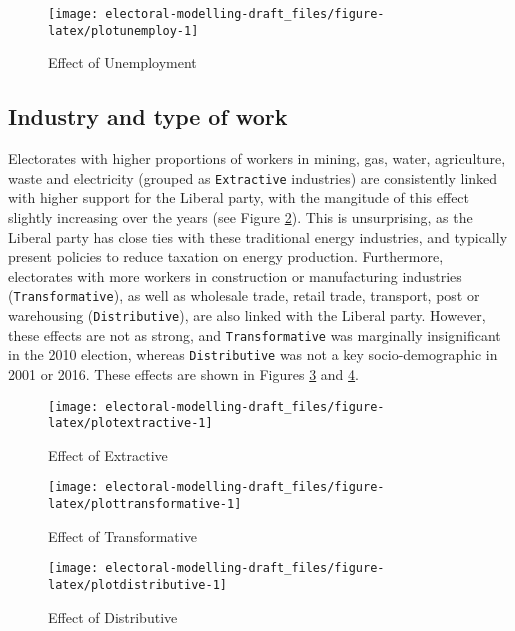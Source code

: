 \documentclass[openany]{book}
\begin{document}
\begin{figure}[h]

{\centering \texttt{[image: electoral-modelling-draft\_files/figure-latex/plotunemploy-1]} 

}

\caption{Effect of Unemployment}\label{fig:plotunemploy}
\end{figure}

\hypertarget{industry-and-type-of-work}{%
\subsection{Industry and type of work}\label{industry-and-type-of-work}}

Electorates with higher proportions of workers in mining, gas, water, agriculture, waste and electricity (grouped as \texttt{Extractive} industries) are consistently linked with higher support for the Liberal party, with the mangitude of this effect slightly increasing over the years (see Figure \ref{fig:plotextractive}). This is unsurprising, as the Liberal party has close ties with these traditional energy industries, and typically present policies to reduce taxation on energy production. Furthermore, electorates with more workers in construction or manufacturing industries (\texttt{Transformative}), as well as wholesale trade, retail trade, transport, post or warehousing (\texttt{Distributive}), are also linked with the Liberal party. However, these effects are not as strong, and \texttt{Transformative} was marginally insignificant in the 2010 election, whereas \texttt{Distributive} was not a key socio-demographic in 2001 or 2016. These effects are shown in Figures \ref{fig:plottransformative} and \ref{fig:plotdistributive}.

\begin{figure}[h]

{\centering \texttt{[image: electoral-modelling-draft\_files/figure-latex/plotextractive-1]} 

}

\caption{Effect of Extractive}\label{fig:plotextractive}
\end{figure}

\begin{figure}[h]

{\centering \texttt{[image: electoral-modelling-draft\_files/figure-latex/plottransformative-1]} 

}

\caption{Effect of Transformative}\label{fig:plottransformative}
\end{figure}
\begin{figure}[h]

{\centering \texttt{[image: electoral-modelling-draft\_files/figure-latex/plotdistributive-1]} 

}

\caption{Effect of Distributive}\label{fig:plotdistributive}
\end{figure}
\end{document}
